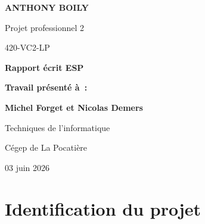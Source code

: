 \documentclass[12pt,a4paper]{article}
\begin{document}

\begin{titlepage}
  \centering
  \vspace*{2.5cm}

  {\LARGE\bfseries ANTHONY BOILY\par}
  \vspace{0.6cm}
  {\large Projet professionnel 2\par}
  {\large 420-VC2-LP\par}

  \vfill

  {\Huge\bfseries Rapport écrit ESP\par}
  \vspace{2cm}

  {\large\bfseries Travail présenté à~:\par}
  \vspace{0.4cm}
  {\large\bfseries Michel Forget et Nicolas Demers\par}

  \vfill

  {\large Techniques de l'informatique\par}
  {\large Cégep de La Pocatière\par}
  \vspace{0.8cm}
  {\large 03 juin 2026\par}
\end{titlepage}

\newpage
\tableofcontents

\newpage
\listoffigures

\newpage

\section{Identification du projet}
\end{document}
